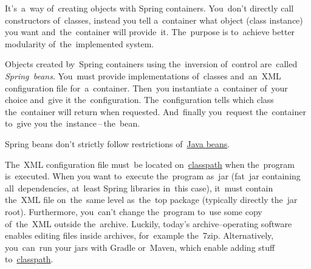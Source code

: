 \label{inversionofcontrol}
It's~a~way of~creating objects with Spring containers. You~don't directly call constructors of~classes, instead you tell a~container what object (class instance) you want and~the~container will provide~it. The~purpose is to~achieve better modularity of~the~implemented system.

Objects created by~Spring containers using the~inversion of~control are~called \textit{Spring~beans}. You~must provide implementations of~classes and~an~XML configuration file for~a~container. Then~you instantiate a~container of~your choice and~give it the~configuration. The~configuration tells which class the~container will return when requested. And~finally you~request the~container to~give you the~instance\,--\,the~bean.

\warning Spring beans don't strictly follow restrictions of~\hyperref[javabeans]{Java beans}.

\warning The~XML configuration file must~be located on~\hyperref[classpath]{classpath} when the~program is~executed. When you want to~execute the~program as~jar (fat~jar containing all~dependencies, at~least Spring libraries in~this case), it~must contain the~XML file on~the~same level as~the~top package (typically directly the~jar root). Furthermore, you~can't change the~program to~use some copy of~the~XML outside the~archive. Luckily, today's archive--operating software enables editing files inside archives, for~example the~7zip. Alternatively, you~can~run your jars with Gradle or~Maven, which enable adding stuff to~\hyperref[classpath]{classpath}.
\newpage

